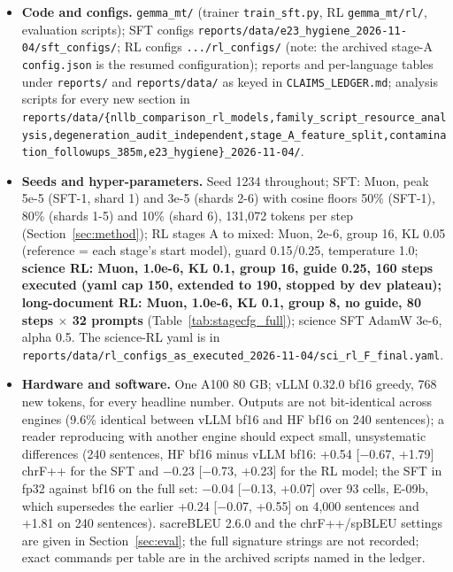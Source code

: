 \begin{itemize}
\item \textbf{Code and configs.} \texttt{gemma\_\allowbreak{}mt/\allowbreak{}} (trainer \texttt{train\_\allowbreak{}sft.\allowbreak{}py}, RL \texttt{gemma\_\allowbreak{}mt/\allowbreak{}rl/\allowbreak{}}, evaluation scripts); SFT configs \texttt{reports/\allowbreak{}data/\allowbreak{}e23\_\allowbreak{}hygiene\_\allowbreak{}2026-\allowbreak{}11-\allowbreak{}04/\allowbreak{}sft\_\allowbreak{}configs/\allowbreak{}}; RL configs \texttt{.\allowbreak{}.\allowbreak{}.\allowbreak{}/\allowbreak{}rl\_\allowbreak{}configs/\allowbreak{}} (note: the archived stage-A \texttt{config.\allowbreak{}json} is the resumed configuration); reports and per-language tables under \texttt{reports/\allowbreak{}} and \texttt{reports/\allowbreak{}data/\allowbreak{}} as keyed in \texttt{CLAIMS\_\allowbreak{}LEDGER.\allowbreak{}md}; analysis scripts for every new section in \texttt{reports/\allowbreak{}data/\allowbreak{}\{nllb\_\allowbreak{}comparison\_\allowbreak{}rl\_\allowbreak{}models,family\_\allowbreak{}script\_\allowbreak{}resource\_\allowbreak{}analysis,degeneration\_\allowbreak{}audit\_\allowbreak{}independent,stage\_\allowbreak{}A\_\allowbreak{}feature\_\allowbreak{}split,contamination\_\allowbreak{}followups\_\allowbreak{}385m,e23\_\allowbreak{}hygiene\}\_\allowbreak{}2026-\allowbreak{}11-\allowbreak{}04/\allowbreak{}}.
\item \textbf{Seeds and hyper-parameters.} Seed 1234 throughout; SFT: Muon, peak 5e-5 (SFT-1, shard 1) and 3e-5 (shards 2-6) with cosine floors 50\% (SFT-1), 80\% (shards 1-5) and 10\% (shard 6), 131,072 tokens per step (Section~\ref{sec:method}); RL stages A to mixed: Muon, 2e-6, group 16, KL 0.05 (reference = each stage's start model), guard 0.15/0.25, temperature 1.0; \textbf{science RL: Muon, 1.0e-6, KL 0.1, group 16, guide 0.25, 160 steps executed (yaml cap 150, extended to 190, stopped by dev plateau); long-document RL: Muon, 1.0e-6, KL 0.1, group 8, no guide, 80 steps $\times$ 32 prompts} (Table~\ref{tab:stagecfg_full}); science SFT AdamW 3e-6, alpha 0.5. The science-RL yaml is in \texttt{reports/\allowbreak{}data/\allowbreak{}rl\_\allowbreak{}configs\_\allowbreak{}as\_\allowbreak{}executed\_\allowbreak{}2026-\allowbreak{}11-\allowbreak{}04/\allowbreak{}sci\_\allowbreak{}rl\_\allowbreak{}F\_\allowbreak{}final.\allowbreak{}yaml}.
\item \textbf{Hardware and software.} One A100 80 GB; vLLM 0.32.0 bf16 greedy, 768 new tokens, for every headline number. Outputs are not bit-identical across engines (9.6\% identical between vLLM bf16 and HF bf16 on 240 sentences); a reader reproducing with another engine should expect small, unsystematic differences (240 sentences, HF bf16 minus vLLM bf16: +0.54 [\ensuremath{-}0.67, +1.79] chrF++ for the SFT and \ensuremath{-}0.23 [\ensuremath{-}0.73, +0.23] for the RL model; the SFT in fp32 against bf16 on the full set: \ensuremath{-}0.04 [\ensuremath{-}0.13, +0.07] over 93 cells, E-09b, which supersedes the earlier +0.24 [\ensuremath{-}0.07, +0.55] on 4,000 sentences and +1.81 on 240 sentences). sacreBLEU 2.6.0 and the chrF++/spBLEU settings are given in Section~\ref{sec:eval}; the full signature strings are not recorded; exact commands per table are in the archived scripts named in the ledger.

\end{itemize}
